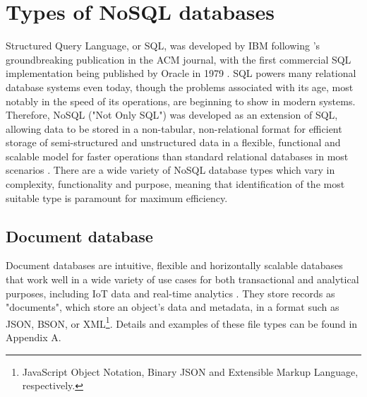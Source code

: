 \chapter{Types of NoSQL databases}
\noindent Structured Query Language, or SQL, was developed by IBM following \textcite{coddRelationalModelData1970}'s groundbreaking 
publication in the ACM journal, with the first commercial SQL implementation being published by Oracle in 1979 \autocite{oracleHistorySQL}.
SQL powers many relational database systems even today, though the problems associated with its age, most notably in 
the speed of its operations, are beginning to show in modern systems. Therefore, NoSQL ("Not Only SQL") was developed as 
an extension of SQL, allowing data to be stored in a non-tabular, non-relational format for efficient storage of
semi-structured and unstructured data in a flexible, functional and scalable model for faster operations than standard 
relational databases in most scenarios \autocite{googlecloudWhatNoSQLDatabases, awsWhatNoSQLDatabase}. There are a wide variety of NoSQL 
database types which vary in complexity, functionality and purpose, meaning that identification of the most suitable type is paramount 
for maximum efficiency. 


\section{Document database}\label{sec:DocDBs}
Document databases are intuitive, flexible and horizontally scalable databases that work well in a wide variety of use cases
for both transactional and analytical purposes, including IoT data and real-time analytics \autocite{mongodbDocumentDatabaseNoSQL}.
They store records as "documents", which store an object's data and metadata, in a format such as JSON, BSON, or XML\footnote{JavaScript Object Notation, Binary JSON and Extensible Markup Language, respectively.}. Details and examples of these file types can be found in Appendix A.

